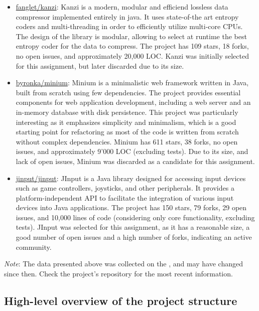 \begin{itemize}
	\item \href{https://github.com/flanglet/kanzi}{fanglet/kanzi}: Kanzi is a modern, modular and efficiend lossless data compressor implemented entirely in java. It uses state-of-the art entropy coders and multi-threading in order to efficiently utilize multi-core CPUs. The design of the library is modular, allowing to select at runtime the best entropy coder for the data to compress. The project has 109 stars, 18 forks, no open issues, and approximately 20,000 LOC. Kanzi was initially selected for this assignment, but later discarded due to its size.
	\item \href{https://github.com/byronka/minum}{byronka/minium}: Minium is a minimalistic web framework written in Java, built from scratch using few dependencies. The project provides essential components for web application development, including a web server and an in-memory database with disk persistence. This project was particularly interesting as it emphasizes simplicity and minimalism, which is a good starting point for refactoring as most of the code is written from scratch without complex dependencies. Minium has 611 stars, 38 forks, no open issues, and approximately 9'000 LOC (excluding tests). Due to its size, and lack of open issues, Minium was discarded as a candidate for this assignment.
	\item \href{https://github.com/jinput/jinput}{jinput/jinput}: JInput is a Java library designed for accessing input devices such as game controllers, joysticks, and other peripherals. It provides a platform-independent API to facilitate the integration of various input devices into Java applications. The project has 150 stars, 79 forks, 29 open issues, and 10,000 lines of code (considering only core functionality, excluding tests). JInput was selected for this assignment, as it has a reasonable size, a good number of open issues and a high number of forks, indicating an active community.
\end{itemize}

\noindent \textit{Note}: The data presented above was collected on the , and may have changed since then. Check the project's repository for the most recent information.

\subsection{High-level overview of the project structure}
\label{sec:project_structure}

